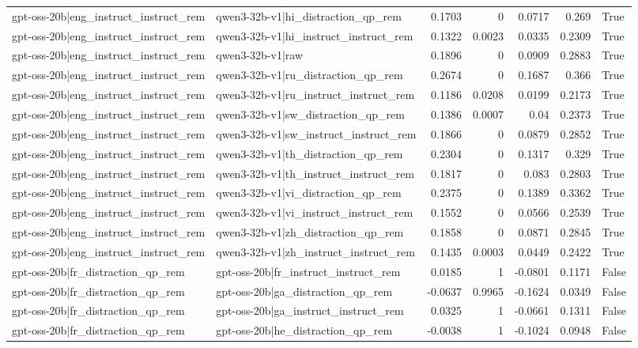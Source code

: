 \begin{table}
\begin{tabular}{l l r r r r l}
gpt-oss-20b|eng_instruct_instruct_rem & qwen3-32b-v1|hi_distraction_qp_rem & 0.1703 & 0 & 0.0717 & 0.269 & True \\
gpt-oss-20b|eng_instruct_instruct_rem & qwen3-32b-v1|hi_instruct_instruct_rem & 0.1322 & 0.0023 & 0.0335 & 0.2309 & True \\
gpt-oss-20b|eng_instruct_instruct_rem & qwen3-32b-v1|raw & 0.1896 & 0 & 0.0909 & 0.2883 & True \\
gpt-oss-20b|eng_instruct_instruct_rem & qwen3-32b-v1|ru_distraction_qp_rem & 0.2674 & 0 & 0.1687 & 0.366 & True \\
gpt-oss-20b|eng_instruct_instruct_rem & qwen3-32b-v1|ru_instruct_instruct_rem & 0.1186 & 0.0208 & 0.0199 & 0.2173 & True \\
gpt-oss-20b|eng_instruct_instruct_rem & qwen3-32b-v1|sw_distraction_qp_rem & 0.1386 & 0.0007 & 0.04 & 0.2373 & True \\
gpt-oss-20b|eng_instruct_instruct_rem & qwen3-32b-v1|sw_instruct_instruct_rem & 0.1866 & 0 & 0.0879 & 0.2852 & True \\
gpt-oss-20b|eng_instruct_instruct_rem & qwen3-32b-v1|th_distraction_qp_rem & 0.2304 & 0 & 0.1317 & 0.329 & True \\
gpt-oss-20b|eng_instruct_instruct_rem & qwen3-32b-v1|th_instruct_instruct_rem & 0.1817 & 0 & 0.083 & 0.2803 & True \\
gpt-oss-20b|eng_instruct_instruct_rem & qwen3-32b-v1|vi_distraction_qp_rem & 0.2375 & 0 & 0.1389 & 0.3362 & True \\
gpt-oss-20b|eng_instruct_instruct_rem & qwen3-32b-v1|vi_instruct_instruct_rem & 0.1552 & 0 & 0.0566 & 0.2539 & True \\
gpt-oss-20b|eng_instruct_instruct_rem & qwen3-32b-v1|zh_distraction_qp_rem & 0.1858 & 0 & 0.0871 & 0.2845 & True \\
gpt-oss-20b|eng_instruct_instruct_rem & qwen3-32b-v1|zh_instruct_instruct_rem & 0.1435 & 0.0003 & 0.0449 & 0.2422 & True \\
gpt-oss-20b|fr_distraction_qp_rem & gpt-oss-20b|fr_instruct_instruct_rem & 0.0185 & 1 & -0.0801 & 0.1171 & False \\
gpt-oss-20b|fr_distraction_qp_rem & gpt-oss-20b|ga_distraction_qp_rem & -0.0637 & 0.9965 & -0.1624 & 0.0349 & False \\
gpt-oss-20b|fr_distraction_qp_rem & gpt-oss-20b|ga_instruct_instruct_rem & 0.0325 & 1 & -0.0661 & 0.1311 & False \\
gpt-oss-20b|fr_distraction_qp_rem & gpt-oss-20b|he_distraction_qp_rem & -0.0038 & 1 & -0.1024 & 0.0948 & False \\

\end{tabular}
\end{table}
